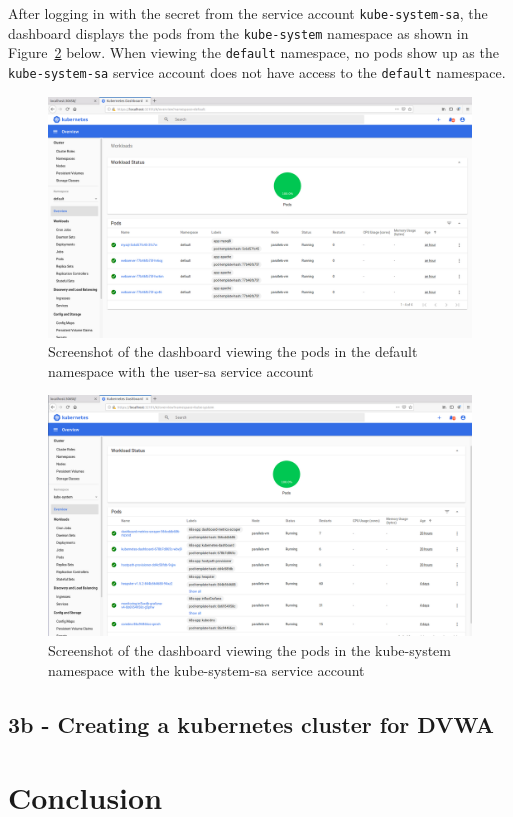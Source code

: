 \documentclass[11pt]{article}
\begin{document}
After logging in with the secret from the service account \verb|kube-system-sa|,
the dashboard displays the pods from the \verb|kube-system| namespace as shown in Figure~\ref{fig:dashboard-kube} below. 
When viewing the \verb|default| namespace, no pods show up as the \verb|kube-system-sa| service account does not have access to the \verb|default| namespace.
\begin{figure}[htbp]
  \centering
  \includegraphics[width=.9\linewidth]{./dashboard-def.png}
  \caption{\label{fig:dashboard-def}
  Screenshot of the dashboard viewing the pods in the default namespace with the user-sa service account}
\end{figure}
\begin{figure}[htbp]
  \centering
  \includegraphics[width=.9\linewidth]{./dashboard-kube.png}
  \caption{\label{fig:dashboard-kube}
    Screenshot of the dashboard viewing the pods in the kube-system namespace with the kube-system-sa service account}
\end{figure}

\newpage
\subsection*{3b - Creating a kubernetes cluster for DVWA}

\section*{Conclusion}
\label{sec:conclusion}


\newpage
\nocite{*}


\end{document}
